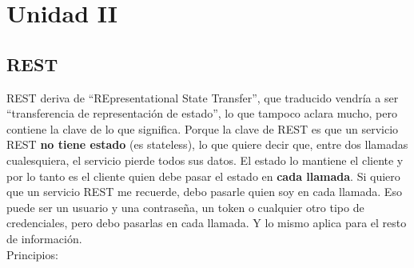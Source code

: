 \documentclass[
	12pt, %
	fleqn, %
	a4paper, %
	oneside, %
]{LegrandOrangeBook}
\begin{document}
\chapter{Unidad II}
\section{REST}
REST deriva de ``REpresentational State Transfer'', que traducido vendría a ser ``transferencia de representación de estado'', lo que tampoco aclara mucho, pero contiene la clave de lo que significa.  Porque la clave de REST es que un servicio REST \textbf{no tiene estado} (es stateless), lo que quiere decir que, entre dos llamadas cualesquiera, el servicio pierde todos sus datos. El estado lo mantiene el cliente y por lo tanto es el cliente quien debe pasar el estado en \textbf{cada llamada}. Si quiero que un servicio REST me recuerde, debo pasarle quien soy en cada llamada. Eso puede ser un usuario y una contraseña, un token o cualquier otro tipo de credenciales, pero debo pasarlas en cada llamada. Y lo mismo aplica para el resto de información.\\
Principios:
\end{document}
